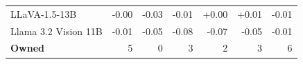 \begin{table}[h]
\begin{tabular}{lrrrrrr}
LLaVA-1.5-13B & \cellcolor{cfTerra1}-0.00 & \cellcolor{cfTerra2}-0.03 & \cellcolor{cfTerra1}-0.01 & \cellcolor{cfSlate1}+0.00 & \cellcolor{cfSlate1}+0.01 & \cellcolor{cfTerra1}-0.01 \\
Llama 3.2 Vision 11B & \cellcolor{cfTerra1}-0.01 & \cellcolor{cfTerra2}-0.05 & \cellcolor{cfTerra2}-0.08 & \cellcolor{cfTerra2}-0.07 & \cellcolor{cfTerra2}-0.05 & \cellcolor{cfTerra1}-0.01 \\
\midrule
\textbf{Owned} & 5 & 0 & 3 & 2 & 3 & 6 \\
\bottomrule
\end{tabular}
\end{table}
